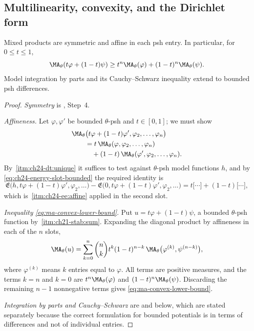 \subsection{Multilinearity, convexity, and the Dirichlet form}
\label{sec:ch24-bounded-calculus}

\begin{corollary}\label{cor:bounded-ma-multilinearity}
Mixed products are symmetric and affine in each psh entry. In particular,
for $0\leq t\leq1$,
\begin{equation}
\label{eq:ma-convex-lower-bound}
 \MA_\theta(t\varphi+(1-t)\psi)
 \geq t^n\MA_\theta(\varphi)+(1-t)^n\MA_\theta(\psi).
\end{equation}
Model integration by parts and its Cauchy--Schwarz inequality extend to
bounded psh differences.
\end{corollary}

\begin{proof}
\emph{Symmetry} is
, Step~4.

\emph{Affineness.}  Let $\varphi,\varphi'$ be bounded $\theta$-psh and
$t\in[0,1]$; we must show
\[
 \begin{aligned}
 &\MA_\theta\bigl(t\varphi+(1-t)\varphi',
     \varphi_2,\ldots,\varphi_n\bigr)\\
 &\qquad=t\,\MA_\theta(\varphi,\varphi_2,\ldots,\varphi_n)\\
 &\qquad\quad+(1-t)\,\MA_\theta(\varphi',\varphi_2,\ldots,\varphi_n).
 \end{aligned}
\]
By \,\cref{itm:ch24-dt:unique} it suffices to test
against $\theta$-psh model functions $h$, and by
\eqref{eq:ch24-energy-slot-bounded} the required identity is
\[
 \mathfrak E\bigl(h,t\varphi+(1-t)\varphi',\varphi_2,\ldots\bigr)
 -\mathfrak E\bigl(0,t\varphi+(1-t)\varphi',\varphi_2,\ldots\bigr)
 =t\bigl[\cdots\bigr]+(1-t)\bigl[\cdots\bigr],
\]
which is
\,\cref{itm:ch24-ee:affine} applied in the
second slot.

\emph{Inequality \eqref{eq:ma-convex-lower-bound}.}  Put
$u=t\varphi+(1-t)\psi$, a bounded $\theta$-psh function by
\,\cref{itm:ch21-stab:sum}.  Expanding the diagonal
product by affineness in each of the $n$ slots,
\[
 \MA_\theta(u)=\sum_{k=0}^{n}\binom nk t^k(1-t)^{n-k}\,
   \MA_\theta\bigl(\varphi^{(k)},\psi^{(n-k)}\bigr),
\]
where $\varphi^{(k)}$ means $k$ entries equal to $\varphi$.  All terms
are positive measures, and the terms $k=n$ and $k=0$ are
$t^n\MA_\theta(\varphi)$ and $(1-t)^n\MA_\theta(\psi)$.  Discarding the
remaining $n-1$ nonnegative terms gives
\eqref{eq:ma-convex-lower-bound}.

\emph{Integration by parts and Cauchy--Schwarz} are
 and
 below, which are stated separately
because the correct formulation for bounded potentials is in terms of
differences and not of individual entries.
\end{proof}

